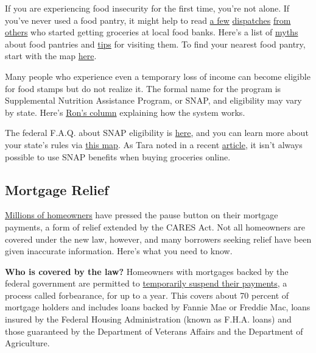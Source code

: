 If you are experiencing food insecurity for the first time, you're not
alone. If you've never used a food pantry, it might help to read
\href{https://medium.com/wake-up-call/i-went-to-the-food-bank-for-the-first-time-37450c89b959}{a
few}
\href{https://workingclassstudies.wordpress.com/2011/12/05/a-visit-to-the-food-pantry/}{dispatches}
\href{https://www.npr.org/sections/thesalt/2019/06/30/735881297/opinion-being-hungry-in-america-is-hard-work-food-banks-need-your-help}{from
others} who started getting groceries at local food banks. Here's a list
of
\href{https://solvehungertoday.org/blog/visiting-food-pantry-myths-facts/}{myths}
about food pantries and
\href{https://extension.sdstate.edu/tips-visiting-food-pantry}{tips} for
visiting them. To find your nearest food pantry, start with the map
\href{https://ampleharvest.org/find-pantry/}{here}.

Many people who experience even a temporary loss of income can become
eligible for food stamps but do not realize it. The formal name for the
program is Supplemental Nutrition Assistance Program, or SNAP, and
eligibility may vary by state. Here's
\href{https://www.nytimes.com/2020/07/17/your-money/food-stamps-coronavirus.html}{Ron's
column} explaining how the system works.

The federal F.A.Q. about SNAP eligibility is
\href{https://www.fns.usda.gov/snap/recipient/eligibility}{here}, and
you can learn more about your state's rules via
\href{https://www.fns.usda.gov/snap/state-directory}{this map}. As Tara
noted in a recent
\href{https://www.nytimes.com/2020/05/01/your-money/food-stamps-snap-coronavirus.html}{article},
it isn't always possible to use SNAP benefits when buying groceries
online.

\hypertarget{mortgage-relief}{%
\subsection{Mortgage Relief}\label{mortgage-relief}}

\href{https://www.nytimes.com/2020/05/15/business/coronavirus-mortgage-relief.html}{Millions
of homeowners} have pressed the pause button on their mortgage payments,
a form of relief extended by the CARES Act. Not all homeowners are
covered under the new law, however, and many borrowers seeking relief
have been given inaccurate information. Here's what you need to know.

\textbf{Who is covered by the law?} Homeowners with mortgages backed by
the federal government are permitted to
\href{https://www.fhfa.gov/Homeownersbuyer/MortgageAssistance/Pages/Coronavirus-Assistance-Information.aspx}{temporarily
suspend their payments}, a process called forbearance, for up to a year.
This covers about 70 percent of mortgage holders and includes loans
backed by Fannie Mae or Freddie Mac, loans insured by the Federal
Housing Administration (known as F.H.A. loans) and those guaranteed by
the Department of Veterans Affairs and the Department of Agriculture.

